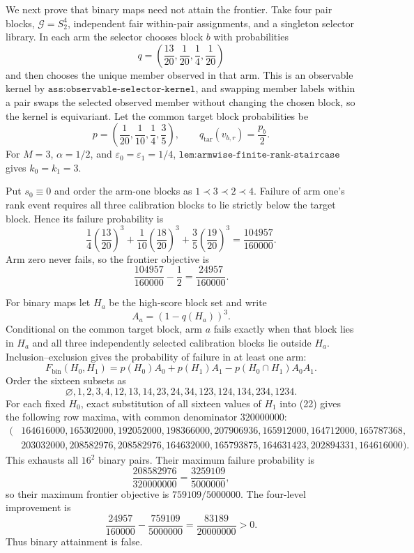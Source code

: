 We next prove that binary maps need not attain the frontier. Take four pair blocks, \(\mathcal G=S_2^4\), independent fair within-pair assignments, and a singleton selector library. In each arm the selector chooses block \(b\) with probabilities
\[
q=\left(\frac{13}{20},\frac1{20},\frac14,\frac1{20}\right)
\tag{17}
\]
and then chooses the unique member observed in that arm. This is an observable kernel by \(\texttt{ass:observable-selector-kernel}\), and swapping member labels within a pair swaps the selected observed member without changing the chosen block, so the kernel is equivariant. Let the common target block probabilities be
\[
p=\left(\frac1{20},\frac1{10},\frac14,\frac35\right),
\qquad q_{\mathrm{tar}}(v_{b,r})=\frac{p_b}{2}.
\tag{18}
\]
For \(M=3\), \(\alpha=1/2\), and \(\varepsilon_0=\varepsilon_1=1/4\), \(\texttt{lem:armwise-finite-rank-staircase}\) gives \(k_0=k_1=3\).

Put \(s_0\equiv0\) and order the arm-one blocks as \(1\prec3\prec2\prec4\). Failure of arm one's rank event requires all three calibration blocks to lie strictly below the target block. Hence its failure probability is
\[
\frac14\left(\frac{13}{20}\right)^3
+\frac1{10}\left(\frac{18}{20}\right)^3
+\frac35\left(\frac{19}{20}\right)^3
=\frac{104957}{160000}.
\tag{19}
\]
Arm zero never fails, so the frontier objective is
\[
\frac{104957}{160000}-\frac12=\frac{24957}{160000}.
\tag{20}
\]

For binary maps let \(H_a\) be the high-score block set and write
\[
A_a=(1-q(H_a))^3.
\tag{21}
\]
Conditional on the common target block, arm \(a\) fails exactly when that block lies in \(H_a\) and all three independently selected calibration blocks lie outside \(H_a\). Inclusion--exclusion gives the probability of failure in at least one arm:
\[
F_{\mathrm{bin}}(H_0,H_1)
=p(H_0)A_0+p(H_1)A_1-p(H_0\cap H_1)A_0A_1.
\tag{22}
\]
Order the sixteen subsets as
\[
\varnothing,1,2,3,4,12,13,14,23,24,34,123,124,134,234,1234.
\]
For each fixed \(H_0\), exact substitution of all sixteen values of \(H_1\) into (22) gives the following row maxima, with common denominator \(320000000\):
\[
\begin{split}
(&164616000,165302000,192052000,198366000,207906936,165912000,164712000,165787368,\\
&203032000,208582976,208582976,164632000,165793875,164631423,202894331,164616000).
\end{split}
\tag{23}
\]
This exhausts all \(16^2\) binary pairs. Their maximum failure probability is
\[
\frac{208582976}{320000000}=\frac{3259109}{5000000},
\]
so their maximum frontier objective is \(759109/5000000\). The four-level improvement is
\[
\frac{24957}{160000}-\frac{759109}{5000000}
=\frac{83189}{20000000}>0.
\tag{24}
\]
Thus binary attainment is false.

